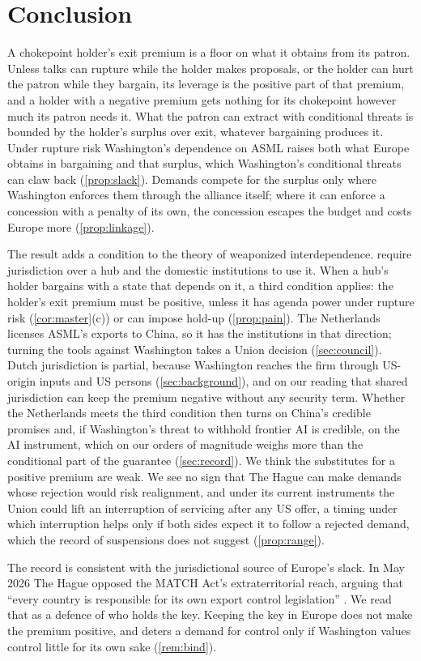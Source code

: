 \section{Conclusion}\label{sec:conclusion}

A chokepoint holder's exit premium is a floor on what it obtains from its patron. Unless talks can rupture while the holder makes proposals, or the holder can hurt the patron while they bargain, its leverage is the positive part of that premium, and a holder with a negative premium gets nothing for its chokepoint however much its patron needs it. What the patron can extract with conditional threats is bounded by the holder's surplus over exit, whatever bargaining produces it. Under rupture risk Washington's dependence on ASML raises both what Europe obtains in bargaining and that surplus, which Washington's conditional threats can claw back (\cref{prop:slack}). Demands compete for the surplus only where Washington enforces them through the alliance itself; where it can enforce a concession with a penalty of its own, the concession escapes the budget and costs Europe more (\cref{prop:linkage}).

The result adds a condition to the theory of weaponized interdependence. \citet{farrell2019weaponized} require jurisdiction over a hub and the domestic institutions to use it. When a hub's holder bargains with a state that depends on it, a third condition applies: the holder's exit premium must be positive, unless it has agenda power under rupture risk (\cref{cor:master}(c)) or can impose hold-up (\cref{prop:pain}). The Netherlands licenses ASML's exports to China, so it has the institutions in that direction; turning the tools against Washington takes a Union decision (\cref{sec:council}). Dutch jurisdiction is partial, because Washington reaches the firm through US-origin inputs and US persons (\cref{sec:background}), and on our reading that shared jurisdiction can keep the premium negative without any security term. Whether the Netherlands meets the third condition then turns on China's credible promises and, if Washington's threat to withhold frontier AI is credible, on the AI instrument, which on our orders of magnitude weighs more than the conditional part of the guarantee (\cref{sec:record}). We think the substitutes for a positive premium are weak. We see no sign that The Hague can make demands whose rejection would risk realignment, and under its current instruments the Union could lift an interruption of servicing after any US offer, a timing under which interruption helps only if both sides expect it to follow a rejected demand, which the record of suspensions does not suggest (\cref{prop:range}).

The record is consistent with the jurisdictional source of Europe's slack. In May 2026 The Hague opposed the MATCH Act's extraterritorial reach, arguing that ``every country is responsible for its own export control legislation'' \citep[our translation]{tk2026match}. We read that as a defence of who holds the key. Keeping the key in Europe does not make the premium positive, and deters a demand for control only if Washington values control little for its own sake (\cref{rem:bind}).
